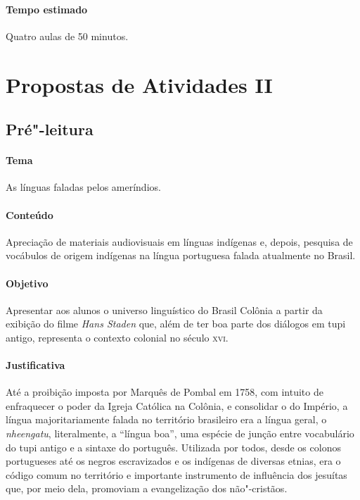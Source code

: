 \documentclass[12pt]{extarticle}
\begin{document}
\paragraph{Tempo estimado} Quatro aulas de 50 minutos.



\section{Propostas de Atividades II}

\subsection{Pré"-leitura}

\paragraph{Tema} As línguas faladas pelos ameríndios. 

\paragraph{Conteúdo} Apreciação de materiais audiovisuais em línguas
indígenas e, depois, pesquisa de vocábulos de origem indígenas na língua
portuguesa falada atualmente no Brasil.

\paragraph{Objetivo} Apresentar aos alunos o universo linguístico do Brasil
Colônia a partir da exibição do filme \emph{Hans Staden} que, além de 
ter boa parte dos diálogos em tupi antigo, representa o contexto colonial
no século \textsc{xvi}.

\paragraph{Justificativa} Até a proibição imposta por Marquês de Pombal
em 1758, com intuito de enfraquecer o poder da Igreja Católica na Colônia,
e consolidar o do Império, a língua majoritariamente falada no território 
brasileiro era a língua geral, o \emph{nheengatu}, literalmente, a 
``língua boa'', uma espécie de junção entre vocabulário do tupi antigo e 
a sintaxe do português. Utilizada por todos, desde os colonos portugueses 
até os negros escravizados e os indígenas de diversas etnias, era o
código comum no território e importante instrumento de influência dos
jesuítas que, por meio dela, promoviam a evangelização dos não"-cristãos.
\end{document}
